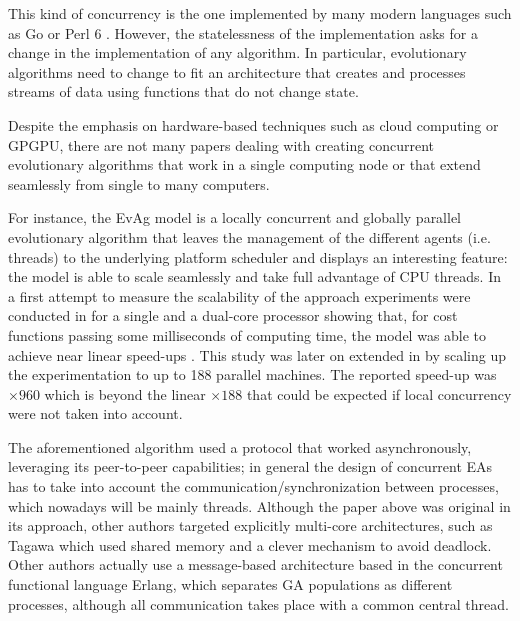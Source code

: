 \documentclass[sigconf]{acmart}
\begin{document}
This kind of concurrency is the one implemented by many modern
languages such as Go or Perl 6 \cite{lenzperl}. However, the
statelessness of the implementation asks for a change in the
implementation of any algorithm. In particular, evolutionary
algorithms need to change to fit an architecture that creates and
processes streams of data using functions that do not change state. 

Despite the emphasis on hardware-based techniques such as
cloud computing or GPGPU, there are not many papers \cite{Xia2010} dealing with
creating concurrent evolutionary algorithms that work in a single
computing node or that extend seamlessly from single to many computers.

For instance, the EvAg model \cite{evag:gpem} is a locally concurrent and globally
parallel evolutionary algorithm that leaves the management of the
different agents (i.e. threads) to the underlying platform scheduler
and displays an interesting feature: the model is able to scale
seamlessly and take full advantage of CPU threads. In a first attempt
to measure the scalability of the approach experiments were conducted
in \cite{wcci:evoag} for a single and a dual-core processor showing
that, for cost functions passing some milliseconds of computing
time, the model was able to achieve near linear speed-ups . This study
was later on extended in \cite{DBLP:conf/evoW/LaredoBMG12} by scaling
up the experimentation to up to 188 parallel machines. The
reported speed-up was $\times 960$ which is beyond the linear $\times
188$ that could be expected if local concurrency were not taken into
account.  

The aforementioned algorithm used a protocol that worked
asynchronously, leveraging its peer-to-peer capabilities; in general
the design of concurrent EAs has to take into account the
communication/synchronization 
between processes, which nowadays will be mainly threads. Although the
paper above was original in its approach, other authors targeted
explicitly multi-core architectures, such as Tagawa
\cite{Tagawa201212} which used shared memory and a clever mechanism to
avoid deadlock. Other authors \cite{kerdprasop2012concurrent} actually
use a message-based architecture based in the concurrent functional
language Erlang, which separates GA populations as different
processes, although all communication takes place with a common
central thread. 
\end{document}
